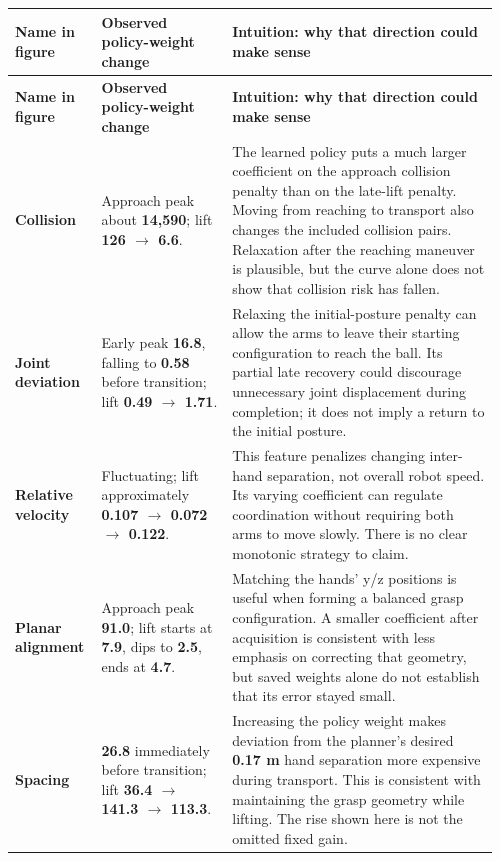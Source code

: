 \documentclass[11pt,a4paper]{article}
\begin{document}
\begingroup\small\setlength{\tabcolsep}{4pt}\renewcommand{\arraystretch}{1.2}
\begin{longtable}{@{}p{0.17\linewidth}p{0.26\linewidth}p{0.53\linewidth}@{}}
\toprule
\textbf{Name in figure} & \textbf{Observed policy-weight change} & \textbf{Intuition: why that direction could make sense} \\
\midrule
\endfirsthead
\toprule
\textbf{Name in figure} & \textbf{Observed policy-weight change} & \textbf{Intuition: why that direction could make sense} \\
\midrule
\endhead
\bottomrule
\endfoot
\textbf{Collision} & Approach peak about \textbf{14,590}; lift \textbf{126 \(\rightarrow\) 6.6}. & The learned policy puts a much larger coefficient on the approach collision penalty than on the late-lift penalty. Moving from reaching to transport also changes the included collision pairs. Relaxation after the reaching maneuver is plausible, but the curve alone does not show that collision risk has fallen. \\
\textbf{Joint deviation} & Early peak \textbf{16.8}, falling to \textbf{0.58} before transition; lift \textbf{0.49 \(\rightarrow\) 1.71}. & Relaxing the initial-posture penalty can allow the arms to leave their starting configuration to reach the ball. Its partial late recovery could discourage unnecessary joint displacement during completion; it does not imply a return to the initial posture. \\
\textbf{Relative velocity} & Fluctuating; lift approximately \textbf{0.107 \(\rightarrow\) 0.072 \(\rightarrow\) 0.122}. & This feature penalizes changing inter-hand separation, not overall robot speed. Its varying coefficient can regulate coordination without requiring both arms to move slowly. There is no clear monotonic strategy to claim. \\
\textbf{Planar alignment} & Approach peak \textbf{91.0}; lift starts at \textbf{7.9}, dips to \textbf{2.5}, ends at \textbf{4.7}. & Matching the hands' y/z positions is useful when forming a balanced grasp configuration. A smaller coefficient after acquisition is consistent with less emphasis on correcting that geometry, but saved weights alone do not establish that its error stayed small. \\
\textbf{Spacing} & \textbf{26.8} immediately before transition; lift \textbf{36.4 \(\rightarrow\) 141.3 \(\rightarrow\) 113.3}. & Increasing the policy weight makes deviation from the planner's desired \textbf{0.17 m} hand separation more expensive during transport. This is consistent with maintaining the grasp geometry while lifting. The rise shown here is not the omitted fixed gain. \\

\end{longtable}
\end{document}
